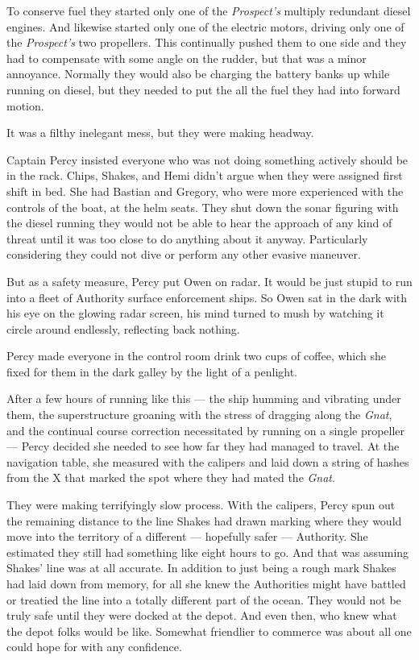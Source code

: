 \documentclass[
]{scrbook}
\begin{document}
To conserve fuel they started only one of the \emph{Prospect's} multiply
redundant diesel engines. And likewise started only one of the electric
motors, driving only one of the \emph{Prospect's} two propellers. This
continually pushed them to one side and they had to compensate with some
angle on the rudder, but that was a minor annoyance. Normally they would
also be charging the battery banks up while running on diesel, but they
needed to put the all the fuel they had into forward motion.

It was a filthy inelegant mess, but they were making headway.

Captain Percy insisted everyone who was not doing something actively
should be in the rack. Chips, Shakes, and Hemi didn't argue when they
were assigned first shift in bed. She had Bastian and Gregory, who were
more experienced with the controls of the boat, at the helm seats. They
shut down the sonar figuring with the diesel running they would not be
able to hear the approach of any kind of threat until it was too close
to do anything about it anyway. Particularly considering they could not
dive or perform any other evasive maneuver.

But as a safety measure, Percy put Owen on radar. It would be just
stupid to run into a fleet of Authority surface enforcement ships. So
Owen sat in the dark with his eye on the glowing radar screen, his mind
turned to mush by watching it circle around endlessly, reflecting back
nothing.

Percy made everyone in the control room drink two cups of coffee, which
she fixed for them in the dark galley by the light of a penlight.

After a few hours of running like this --- the ship humming and
vibrating under them, the superstructure groaning with the stress of
dragging along the \emph{Gnat}, and the continual course correction
necessitated by running on a single propeller --- Percy decided she
needed to see how far they had managed to travel. At the navigation
table, she measured with the calipers and laid down a string of hashes
from the X that marked the spot where they had mated the \emph{Gnat}.

They were making terrifyingly slow process. With the calipers, Percy
spun out the remaining distance to the line Shakes had drawn marking
where they would move into the territory of a different --- hopefully
safer --- Authority. She estimated they still had something like eight
hours to go. And that was assuming Shakes' line was at all accurate. In
addition to just being a rough mark Shakes had laid down from memory,
for all she knew the Authorities might have battled or treatied the line
into a totally different part of the ocean. They would not be truly safe
until they were docked at the depot. And even then, who knew what the
depot folks would be like. Somewhat friendlier to commerce was about all
one could hope for with any confidence.
\end{document}

